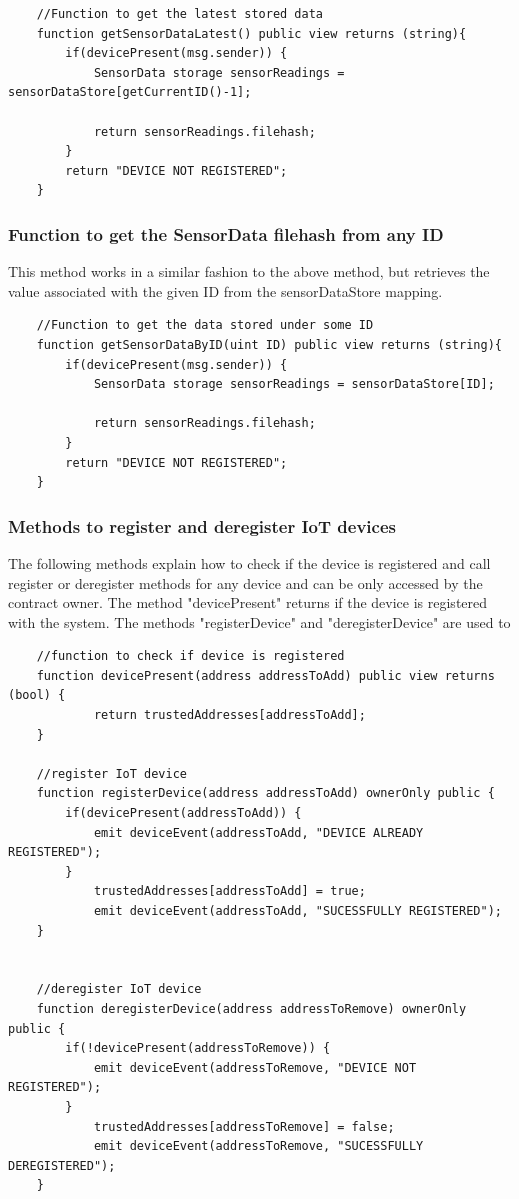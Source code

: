 \documentclass[11pt,openright]{report}
\begin{document}
\begin{verbatim}
    //Function to get the latest stored data
    function getSensorDataLatest() public view returns (string){
        if(devicePresent(msg.sender)) {
            SensorData storage sensorReadings = sensorDataStore[getCurrentID()-1];

            return sensorReadings.filehash;
        }
        return "DEVICE NOT REGISTERED";
    }
\end{verbatim}

\subsubsection{Function to get the SensorData filehash from any ID}
This method works in a similar fashion to the above method, but retrieves the value associated with the given ID from the sensorDataStore mapping.

\begin{verbatim}
    //Function to get the data stored under some ID
    function getSensorDataByID(uint ID) public view returns (string){
        if(devicePresent(msg.sender)) {
            SensorData storage sensorReadings = sensorDataStore[ID];

            return sensorReadings.filehash;
        }
        return "DEVICE NOT REGISTERED";
    }
\end{verbatim}

\subsubsection{Methods to register and deregister IoT devices}
The following methods explain how to check if the device is registered and call register or deregister methods for any device and can be only accessed by the contract owner. 
The method "devicePresent" returns if the device is registered with the system.
The methods "registerDevice" and "deregisterDevice" are used to 
\begin{verbatim}
    //function to check if device is registered
    function devicePresent(address addressToAdd) public view returns (bool) {
            return trustedAddresses[addressToAdd];
    }
    
    //register IoT device
    function registerDevice(address addressToAdd) ownerOnly public {
        if(devicePresent(addressToAdd)) {
            emit deviceEvent(addressToAdd, "DEVICE ALREADY REGISTERED");
        }
            trustedAddresses[addressToAdd] = true;
            emit deviceEvent(addressToAdd, "SUCESSFULLY REGISTERED");
    }
    
    
    //deregister IoT device
    function deregisterDevice(address addressToRemove) ownerOnly public {
        if(!devicePresent(addressToRemove)) {
            emit deviceEvent(addressToRemove, "DEVICE NOT REGISTERED");
        }
            trustedAddresses[addressToRemove] = false;
            emit deviceEvent(addressToRemove, "SUCESSFULLY DEREGISTERED");
    }
\end{verbatim}
\newpage
\end{document}
